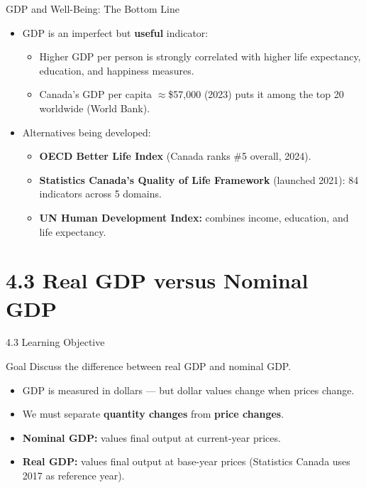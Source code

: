 \documentclass[aspectratio=169]{beamer}
\begin{document}
\begin{frame}{GDP and Well-Being: The Bottom Line}
\transfade
\begin{itemize}
  \item GDP is an \alert{imperfect} but \textbf{useful} indicator:
  \begin{itemize}
    \item Higher GDP per person is strongly correlated with higher life expectancy, education, and happiness measures.
    \item Canada's GDP per capita $\approx$\$57,000 (2023) puts it among the top 20 worldwide (World Bank).
  \end{itemize}
  \item Alternatives being developed:
  \begin{itemize}
    \item \textbf{OECD Better Life Index} (Canada ranks \#5 overall, 2024).
    \item \textbf{Statistics Canada's Quality of Life Framework} (launched 2021): 84 indicators across 5 domains.
    \item \textbf{UN Human Development Index:} combines income, education, and life expectancy.
  \end{itemize}
\end{itemize}
\end{frame}

\section{4.3 Real GDP versus Nominal GDP}

\begin{frame}{4.3 Learning Objective}
\transfade
\begin{block}{Goal}
Discuss the difference between real GDP and nominal GDP.
\end{block}
\begin{itemize}
  \item GDP is measured in dollars --- but dollar values change when prices change.
  \item We must separate \textbf{quantity changes} from \textbf{price changes}.
  \item \textbf{Nominal GDP:} values final output at \alert{current-year prices}.
  \item \textbf{Real GDP:} values final output at \alert{base-year prices} (Statistics Canada uses 2017 as reference year).
\end{itemize}
\end{frame}
\end{document}
